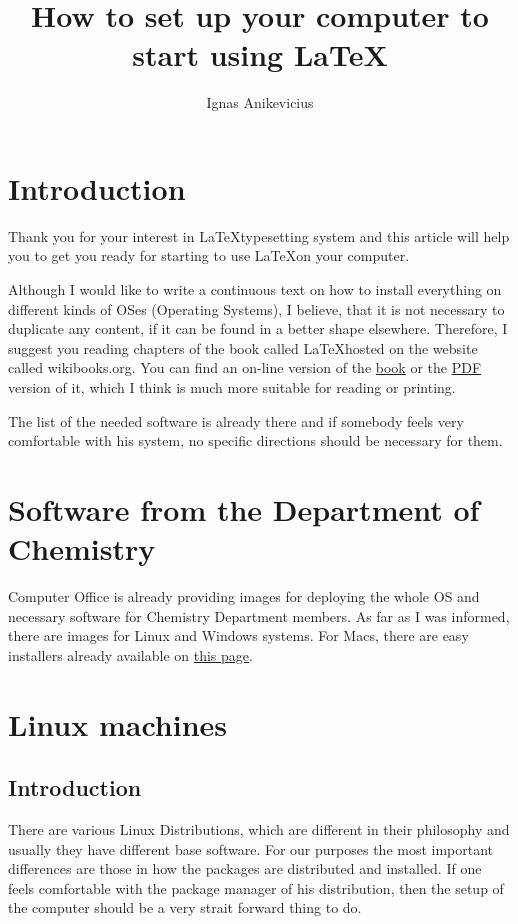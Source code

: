 \documentclass[a4paper]{article}
\title{How to set up your computer to start using LaTeX}
\author{Ignas Anikevicius}
\begin{document}
\maketitle

\section{Introduction}

Thank you for your interest in \LaTeX typesetting system and this article
will help you to get you ready for starting to use \LaTeX on your
computer.

Although I would like to write a continuous text on how to install
everything on different kinds of OSes (Operating Systems), I believe, that it
is not necessary to duplicate any content, if it can be found in a better
shape elsewhere. Therefore, I suggest you reading chapters of the book called
\LaTeX hosted on the website called wikibooks.org. You can find an on-line
version of the
\href{https://secure.wikimedia.org/wikibooks/en/wiki/LaTeX}{book} or the
\href{http://upload.wikimedia.org/wikipedia/commons/2/2d/LaTeX.pdf}{PDF}
version of it, which I think is much more suitable for reading or printing.

The list of the needed software is already there and if somebody feels very
comfortable with his system, no specific directions should be necessary for
them.

\section{Software from the Department of Chemistry}

Computer Office is already providing images for deploying the whole OS and
necessary software for Chemistry Department members. As far as I was informed,
there are images for Linux and Windows systems. For Macs, there are easy
installers already available on \href{http://www.google.co.uk}{this page}.

\section{Linux machines}

\subsection{Introduction}

There are various Linux Distributions, which are different in their philosophy
and usually they have different base software. For our purposes the most
important differences are those in how the packages are distributed and
installed. If one feels comfortable with the package manager of his
distribution, then the setup of the computer should be a very strait forward
thing to do.
\end{document}
